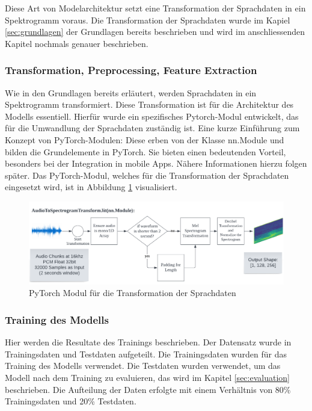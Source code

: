 \documentclass[11pt,a4paper]{article}
\begin{document}
\noindent \newline
Diese Art von Modelarchitektur setzt eine Transformation der Sprachdaten in ein Spektrogramm voraus.
Die Transformation der Sprachdaten wurde im Kapiel \ref{sec:grundlagen} der Grundlagen bereits
beschrieben und wird im anschliessenden Kapitel nochmals genauer beschrieben.


\subsubsection{Transformation, Preprocessing, Feature Extraction}
Wie in den Grundlagen bereits erläutert, werden Sprachdaten in ein Spektrogramm transformiert. 
Diese Transformation ist für die Architektur des Modells essentiell. Hierfür wurde ein spezifisches 
Pytorch-Modul entwickelt, das für die Umwandlung der Sprachdaten zuständig ist. Eine kurze 
Einführung zum Konzept von PyTorch-Modulen: Diese erben von der Klasse nn.Module und bilden die 
Grundelemente in PyTorch. Sie bieten einen bedeutenden Vorteil, besonders bei der Integration in 
mobile Apps. Nähere Informationen hierzu folgen später. Das PyTorch-Modul, welches für die 
Transformation der Sprachdaten eingesetzt wird, ist in Abbildung \ref{fig:transform} visualisiert.

\begin{figure}[H]
	\centering
	\includegraphics[width=1.0\linewidth]{img/transform.pdf}
	\caption{PyTorch Modul für die Transformation der Sprachdaten}
	\label{fig:transform}
\end{figure}


\subsubsection{Training des Modells}
Hier werden die Resultate des Trainings beschrieben. Der Datensatz wurde in Trainingsdaten und 
Testdaten aufgeteilt. Die Trainingsdaten wurden für das Training des Modells verwendet. 
Die Testdaten wurden verwendet, um das Modell nach dem Training zu evaluieren, das wird im 
Kapitel \ref{sec:evaluation} beschrieben. Die Aufteilung der Daten erfolgte mit einem Verhältnis 
von 80\% Trainingsdaten und 20\% Testdaten.
\end{document}
